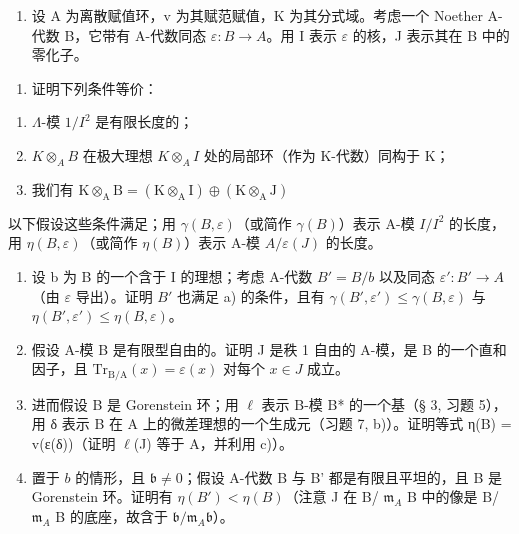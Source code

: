\begin{enumerate}
\def\labelenumi{\arabic{enumi})}
\setcounter{enumi}{9}
\tightlist
\item
  设 A 为离散赋值环，v 为其赋范赋值，K 为其分式域。考虑一个 Noether A-代数 B，它带有 A-代数同态 \(\varepsilon:B\to A\)。用 I 表示 \(\varepsilon\) 的核，J 表示其在 B 中的零化子。
\end{enumerate}

\begin{enumerate}
\def\labelenumi{\alph{enumi})}
\tightlist
\item
  证明下列条件等价：
\end{enumerate}

\begin{enumerate}
\def\labelenumi{(\roman{enumi})}
\item
  \(\Lambda\)-模 \(1 / I^2\) 是有限长度的；
\item
  \(K \otimes_{A} B\) 在极大理想 \(K \otimes_{A} I\) 处的局部环（作为 K-代数）同构于 K；
\item
  我们有 \(\mathrm{K}\otimes_{\mathrm{A}}\mathrm{B} = (\mathrm{K}\otimes_{\mathrm{A}}\mathrm{I})\oplus (\mathrm{K}\otimes_{\mathrm{A}}\mathrm{J})\)
\end{enumerate}

以下假设这些条件满足；用 \(\gamma(B, \varepsilon)\)（或简作 \(\gamma(B)\)）表示 A-模 \(I/I^{2}\) 的长度，用 \(\eta(B, \varepsilon)\)（或简作 \(\eta(B)\)）表示 A-模 \(A/\varepsilon(J)\) 的长度。

\begin{enumerate}
\def\labelenumi{\alph{enumi})}
\setcounter{enumi}{1}
\item
  设 b 为 B 的一个含于 I 的理想；考虑 A-代数 \(B' = B/b\) 以及同态 \(\varepsilon': B' \to A\)（由 \(\varepsilon\) 导出）。证明 \(B'\) 也满足 a) 的条件，且有 \(\gamma(B', \varepsilon') \leqslant \gamma(B, \varepsilon)\) 与 \(\eta(B', \varepsilon') \leqslant \eta(B, \varepsilon)\)。
\item
  假设 A-模 B 是有限型自由的。证明 J 是秩 1 自由的 A-模，是 B 的一个直和因子，且 \(\mathrm{Tr}_{\mathrm{B / A}}(x) = \varepsilon (x)\) 对每个 \(x\in J\) 成立。
\item
  进而假设 B 是 Gorenstein 环；用 \(\ell\) 表示 B-模 B* 的一个基（§ 3, 习题 5），用 δ 表示 B 在 A 上的微差理想的一个生成元（习题 7, b)）。证明等式 η(B) = v(ε(δ))（证明 \(\ell\)(J) 等于 A，并利用 c)）。
\item
  置于 \(b\) 的情形，且 \(\mathfrak{b} \neq 0\)；假设 A-代数 B 与 B' 都是有限且平坦的，且 B 是 Gorenstein 环。证明有 \(\eta(B') < \eta(B)\)（注意 J 在 B/ \(\mathfrak{m}_{A}\) B 中的像是 B/ \(\mathfrak{m}_{A}\) B 的底座，故含于 \(\mathfrak{b}/\mathfrak{m}_{A}\mathfrak{b}\)）。
\end{enumerate}

